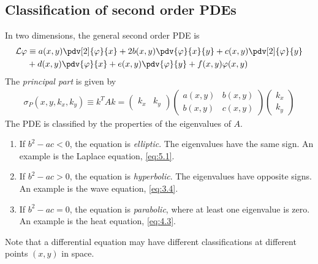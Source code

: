 \subsection{Classification of second order PDEs}
In two dimensions, the general second order PDE is
\begin{align} \label{eq:9.11}
    \begin{split}
        \mathcal L \phi & \equiv a(x,y) \pdv[2]{\phi}{x} + 2 b(x,y) \pdv{\phi}{x}{y} + c(x,y) \pdv[2]{\phi}{y} \\
        &+ d(x,y) \pdv{\phi}{x} + e(x,y) \pdv{\phi}{y} + f(x,y) \phi(x,y)
    \end{split} 
\end{align}
The \textit{principal part} is given by
\begin{align*}
	\sigma_P (x,y,k_x,k_y) \equiv k^T A k = \begin{pmatrix}
		k_x & k_y
	\end{pmatrix} \begin{pmatrix}
		a(x,y) & b(x,y) \\
		b(x,y) & c(x,y)
	\end{pmatrix} \begin{pmatrix}
		k_x \\ k_y
	\end{pmatrix}
\end{align*}
The PDE is classified by the properties of the eigenvalues of $A$.
\begin{enumerate}
	\item If $b^2 - ac < 0$, the equation is \textit{elliptic}.
	      The eigenvalues have the same sign.
	      An example is the Laplace equation, \cref{eq:5.1}.
	\item If $b^2 - ac > 0$, the equation is \textit{hyperbolic}.
	      The eigenvalues have opposite signs.
	      An example is the wave equation, \cref{eq:3.4}.
	\item If $b^2 - ac = 0$, the equation is \textit{parabolic}, where at least one eigenvalue is zero.
	      An example is the heat equation, \cref{eq:4.3}.
\end{enumerate}
Note that a differential equation may have different classifications at different points $(x,y)$ in space.


